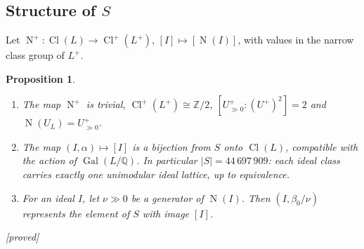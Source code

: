 \documentclass[11pt,a4paper]{amsart}
\theoremstyle{plain}
\newtheorem{proposition}[theorem]{Proposition}
\theoremstyle{definition}
\numberwithin{equation}{section}
\newcommand{\Q}{\mathbb{Q}}
\newcommand{\Z}{\mathbb{Z}}
\DeclareMathOperator{\Nm}{N}
\DeclareMathOperator{\Cl}{Cl}
\DeclareMathOperator{\Gal}{Gal}
\newcommand{\Clp}{\Cl^{+}}
\newcommand{\Up}{U^{+}}
\newcommand{\Upp}{U^{+}_{\gg0}}
\newcommand{\st}[1]{\textup{\textsf{\small[#1]}}}
\newcommand{\DEM}{\st{proved}}
\begin{document}
\subsection{Structure of \texorpdfstring{$S$}{S}}
Let $\Nm^+\colon\Cl(L)\to\Clp(L^+)$, $[I]\mapsto[\Nm(I)]$, with values in the narrow class group of $L^+$.

\begin{proposition}\label{prop:S}
\begin{enumerate}[label=\textup{(\alph*)}]
\item The map $\Nm^+$ is trivial, $\Clp(L^+)\cong\Z/2$, $[\Upp:(\Up)^2]=2$ and $\Nm(U_L)=\Upp$.
\item The map $(I,\alpha)\mapsto[I]$ is a bijection from $S$ onto $\Cl(L)$, compatible with the action of $\Gal(L/\Q)$. In particular $|S|=44\,697\,909$: each ideal class carries exactly one unimodular ideal lattice, up to equivalence.
\item For an ideal $I$, let $\nu\gg0$ be a generator of $\Nm(I)$. Then $(I,\beta_0/\nu)$ represents the element of $S$ with image $[I]$.
\end{enumerate}
\DEM
\end{proposition}
\end{document}
